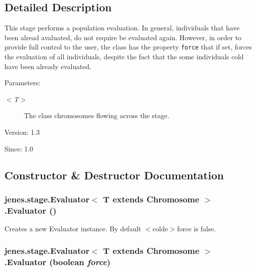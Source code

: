 \subsection{Detailed Description}
This stage performs a population evaluation. In general, individuals that have been alread avaluated, do not require be evaluated again. However, in order to provide full control to the user, the class has the property {\tt force} that if set, forces the evaluation of all individuals, despite the fact that the some individuals cold have been already evaluated. 

\begin{Desc}
\item[Parameters:]
\begin{description}
\item[{\em $<$T$>$}]The class chromosomes flowing across the stage.\end{description}
\end{Desc}
\begin{Desc}
\item[Version:]1.3 \end{Desc}
\begin{Desc}
\item[Since:]1.0 \end{Desc}


\subsection{Constructor \& Destructor Documentation}
\hypertarget{classjenes_1_1stage_1_1_evaluator_3_01_t_01extends_01_chromosome_01_4_fe7302209d1e39a0267bf4320d6d298d}{
\subsubsection[Evaluator]{\setlength{\rightskip}{0pt plus 5cm}jenes.stage.Evaluator$<$ T extends Chromosome $>$.Evaluator ()}}
\label{classjenes_1_1stage_1_1_evaluator_3_01_t_01extends_01_chromosome_01_4_fe7302209d1e39a0267bf4320d6d298d}


Creates a new Evaluator instance. By default $<$colde$>$force is false. \hypertarget{classjenes_1_1stage_1_1_evaluator_3_01_t_01extends_01_chromosome_01_4_d156e40a9579040474e6720f14c49919}{
\subsubsection[Evaluator]{\setlength{\rightskip}{0pt plus 5cm}jenes.stage.Evaluator$<$ T extends Chromosome $>$.Evaluator (boolean {\em force})}}
\label{classjenes_1_1stage_1_1_evaluator_3_01_t_01extends_01_chromosome_01_4_d156e40a9579040474e6720f14c49919}


